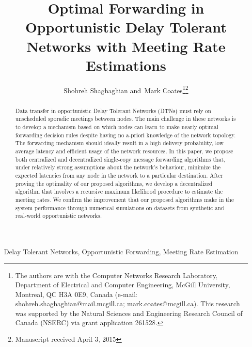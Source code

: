 \documentclass[journal,onecolumn,11pt]{IEEEtran}
\theoremstyle{plain}
\theoremstyle{definition}
\begin{document}
\title{Optimal Forwarding in Opportunistic Delay Tolerant Networks with Meeting Rate Estimations}

\author{Shohreh Shaghaghian and~Mark Coates\thanks{The authors are with the Computer Networks Research Laboratory, Department of Electrical and Computer Engineering, McGill University, Montreal, QC H3A 0E9, Canada (e-mail:
shohreh.shaghaghian@mail.mcgill.ca;
mark.coates@mcgill.ca). This research was supported by the Natural
Sciences and Engineering Research Council of Canada (NSERC) via grant
application 261528.}\thanks{Manuscript received April 3, 2015}}


\maketitle

\begin{abstract}
  Data transfer in opportunistic Delay Tolerant Networks (DTNs) must
  rely on unscheduled sporadic meetings between nodes. The main
  challenge in these networks is to develop a mechanism based on which
  nodes can learn to make nearly optimal forwarding decision rules despite having
  no a-priori knowledge of the network topology. The forwarding
  mechanism should ideally result in a high delivery probability, low
  average latency and efficient usage of the network resources. 
  In this paper, we propose both centralized and
  decentralized single-copy message forwarding algorithms that, under relatively
  strong assumptions about the network’s behaviour, minimize the
  expected latencies from any node in the network to a particular
  destination. After proving the optimality of our proposed
  algorithms, we develop a decentralized algorithm that involves a
  recursive maximum likelihood procedure to estimate the meeting
  rates.  We confirm the improvement that our proposed algorithms make
  in the system performance through numerical simulations on datasets
  from synthetic and real-world opportunistic networks.
\end{abstract}

\begin{IEEEkeywords}
Delay Tolerant Networks, Opportunistic Forwarding, Meeting Rate Estimation
\end{IEEEkeywords}

\IEEEpeerreviewmaketitle
\end{document}
